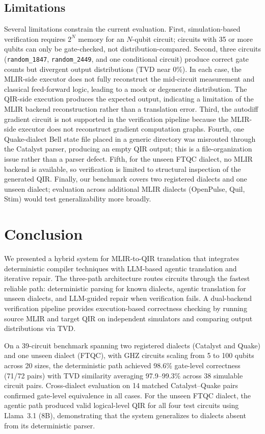\documentclass[conference]{IEEEtran}
\begin{document}
\subsection{Limitations}\label{sec:limitations}

Several limitations constrain the current evaluation. First, simulation-based verification requires $2^N$ memory for an $N$-qubit circuit; circuits with 35 or more qubits can only be gate-checked, not distribution-compared. Second, three circuits (\texttt{random\_1847}, \texttt{random\_2449}, and one conditional circuit) produce correct gate counts but divergent output distributions (TVD near 0\%). In each case, the MLIR-side executor does not fully reconstruct the mid-circuit measurement and classical feed-forward logic, leading to a mock or degenerate distribution. The QIR-side execution produces the expected output, indicating a limitation of the MLIR backend reconstruction rather than a translation error. Third, the autodiff gradient circuit is not supported in the verification pipeline because the MLIR-side executor does not reconstruct gradient computation graphs. Fourth, one Quake-dialect Bell state file placed in a generic directory was misrouted through the Catalyst parser, producing an empty QIR output; this is a file-organization issue rather than a parser defect. Fifth, for the unseen FTQC dialect, no MLIR backend is available, so verification is limited to structural inspection of the generated QIR. Finally, our benchmark covers two registered dialects and one unseen dialect; evaluation across additional MLIR dialects (OpenPulse, Quil, Stim) would test generalizability more broadly.

\section{Conclusion}\label{sec:conclusion}

We presented a hybrid system for MLIR-to-QIR translation that integrates deterministic compiler techniques with LLM-based agentic translation and iterative repair. The three-path architecture routes circuits through the fastest reliable path: deterministic parsing for known dialects, agentic translation for unseen dialects, and LLM-guided repair when verification fails. A dual-backend verification pipeline provides execution-based correctness checking by running source MLIR and target QIR on independent simulators and comparing output distributions via TVD.

On a 39-circuit benchmark spanning two registered dialects (Catalyst and Quake) and one unseen dialect (FTQC), with GHZ circuits scaling from 5 to 100 qubits across 20 sizes, the deterministic path achieved 98.6\% gate-level correctness (71/72 pairs) with TVD similarity averaging 97.9--99.3\% across 38 simulable circuit pairs. Cross-dialect evaluation on 14 matched Catalyst--Quake pairs confirmed gate-level equivalence in all cases. For the unseen FTQC dialect, the agentic path produced valid logical-level QIR for all four test circuits using Llama~3.1 (8B), demonstrating that the system generalizes to dialects absent from its deterministic parser.
\end{document}

